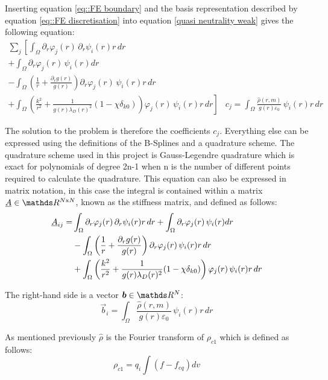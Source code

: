 Inserting equation \ref{eq::FE boundary} and the basis representation described by equation \ref{eq::FE discretisation} into equation \ref{quasi neutrality weak} gives the following equation:
\begin{align}
 \underset{j}{\sum}\left[\int_\Omega\partial_r\varphi_j(r)\,\partial_r\psi_i(r)r\, dr \right. & \nonumber\\
 +\int_\Omega\partial_r\varphi_j(r)\,\psi_i(r) dr & \nonumber\\
 - \int_\Omega \left(\frac{1}{r}+\frac{\partial_rg(r)}{g(r)}\right)\partial_r\varphi_j(r)\,\psi_i(r)r\, dr & \\
 \left.+ \int_\Omega\left(\frac{k^2}{r^2}+\frac{1}{g(r)\lambda_D(r)^2}(1-\chi\delta_{k0})\right)\varphi_j(r)\,\psi_i(r)r\, dr\right]&c_j=\int_\Omega\frac{\hat{\rho}(r,m)}{g(r)\varepsilon_0}\,\psi_i(r)r\, dr\nonumber
\end{align}

The solution to the problem is therefore the coefficients $c_j$. Everything else can be expressed using the definitions of the B-Splines and a quadrature scheme. The quadrature scheme used in this project is Gauss-Legendre quadrature which is exact for polynomials of degree 2n-1 when n is the number of different points required to calculate the quadrature. This equation can also be expressed in matrix notation, in this case the integral is contained within a matrix $\mat{A}\in\reel^{N\text{x}N}$, known as the stiffness matrix, and defined as follows:
\begin{align}
 \underline{A}_{ij}=&\int_\Omega\partial_r\varphi_j(r)\,\partial_r\psi_i(r)r\, dr +\int_\Omega\partial_r\varphi_j(r)\,\psi_i(r) dr\nonumber\\
 &- \int_\Omega\left(\frac{1}{r}+\frac{\partial_rg(r)}{g(r)}\right) \partial_r\varphi_j(r)\,\psi_i(r)r\, dr\nonumber\\
 &+ \int_\Omega\left(\frac{k^2}{r^2}+\frac{1}{g(r)\lambda_D(r)^2}(1-\chi\delta_{k0})\right)\varphi_j(r)\,\psi_i(r)r\, dr
\end{align}

The right-hand side is a vector $\vec{b}\in\reel^{N}$:
\begin{equation}
 \vec{b}_i = \int_\Omega\frac{\hat{\rho}(r,m)}{g(r)\varepsilon_0}\,\psi_i(r)r\, dr\nonumber
\end{equation}

As mentioned previously $\hat{\rho}$ is the Fourier transform of $\rho_{c1}$ which is defined as follows:
\begin{equation}
 \rho_{c1} = q_i \int (f - f_{eq}) dv
\end{equation}

